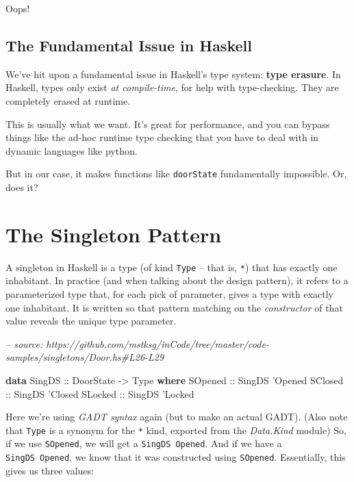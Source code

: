 \documentclass[]{article}
\newenvironment{Shaded}{}{}
\newcommand{\CommentTok}[1]{\textcolor[rgb]{0.38,0.63,0.69}{\textit{#1}}}
\newcommand{\DataTypeTok}[1]{\textcolor[rgb]{0.56,0.13,0.00}{#1}}
\newcommand{\KeywordTok}[1]{\textcolor[rgb]{0.00,0.44,0.13}{\textbf{#1}}}
\newcommand{\NormalTok}[1]{#1}
\newcommand{\OtherTok}[1]{\textcolor[rgb]{0.00,0.44,0.13}{#1}}
\begin{document}
Oops!

\hypertarget{the-fundamental-issue-in-haskell}{%
\subsection{The Fundamental Issue in
Haskell}\label{the-fundamental-issue-in-haskell}}

We've hit upon a fundamental issue in Haskell's type system: \textbf{type
erasure}. In Haskell, types only exist \emph{at compile-time}, for help with
type-checking. They are completely erased at runtime.

This is usually what we want. It's great for performance, and you can bypass
things like the ad-hoc runtime type checking that you have to deal with in
dynamic languages like python.

But in our case, it makes functions like \texttt{doorState} fundamentally
impossible. Or, does it?

\hypertarget{the-singleton-pattern}{%
\section{The Singleton Pattern}\label{the-singleton-pattern}}

A singleton in Haskell is a type (of kind \texttt{Type} -- that is, \texttt{*})
that has exactly one inhabitant. In practice (and when talking about the design
pattern), it refers to a parameterized type that, for each pick of parameter,
gives a type with exactly one inhabitant. It is written so that pattern matching
on the \emph{constructor} of that value reveals the unique type parameter.

\begin{Shaded}
\begin{Highlighting}[]
\CommentTok{-- source: https://github.com/mstksg/inCode/tree/master/code-samples/singletons/Door.hs#L26-L29}

\KeywordTok{data} \DataTypeTok{SingDS}\OtherTok{ ::} \DataTypeTok{DoorState} \OtherTok{->} \DataTypeTok{Type} \KeywordTok{where}
    \DataTypeTok{SOpened}\OtherTok{ ::} \DataTypeTok{SingDS}\NormalTok{ '}\DataTypeTok{Opened}
    \DataTypeTok{SClosed}\OtherTok{ ::} \DataTypeTok{SingDS}\NormalTok{ '}\DataTypeTok{Closed}
    \DataTypeTok{SLocked}\OtherTok{ ::} \DataTypeTok{SingDS}\NormalTok{ '}\DataTypeTok{Locked}
\end{Highlighting}
\end{Shaded}

Here we're using \emph{GADT syntax} again (but to make an actual GADT). (Also
note that \texttt{Type} is a synonym for the \texttt{*} kind, exported from the
\emph{Data.Kind} module) So, if we use \texttt{SOpened}, we will get a
\texttt{SingDS\ \textquotesingle{}Opened}. And if we have a
\texttt{SingDS\ \textquotesingle{}Opened}, we know that it was constructed using
\texttt{SOpened}. Essentially, this gives us three values:
\end{document}
